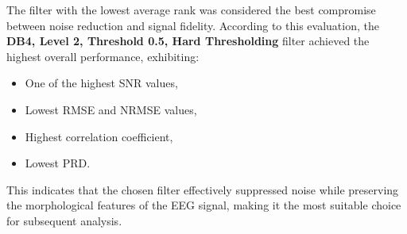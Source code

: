 \documentclass{article}
\begin{document}
			The filter with the lowest average rank was considered the best compromise between noise reduction and signal fidelity. According to this evaluation, the \textbf{DB4, Level 2, Threshold 0.5, Hard Thresholding} filter achieved the highest overall performance, exhibiting:
			\begin{itemize}
			    \item One of the highest SNR values,
			    \item Lowest RMSE and NRMSE values,
			    \item Highest correlation coefficient,
			    \item Lowest PRD.
			\end{itemize}
			This indicates that the chosen filter effectively suppressed noise while preserving the morphological features of the EEG signal, making it the most suitable choice for subsequent analysis.



	\newpage





\end{document}
